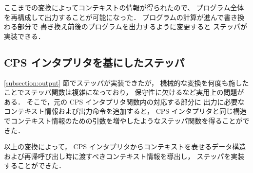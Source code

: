 ここまでの変換によってコンテキストの情報が得られたので、
プログラム全体を再構成して出力することが可能になった．
プログラムの計算が進んで書き換わる部分で
書き換え前後のプログラムを出力するように変更すると
ステッパが実装できる．

\subsection{CPS インタプリタを基にしたステッパ}
\label{subsection:stepper}

\ref{subsection:output} 節でステッパが実装できたが，
機械的な変換を何度も施したことでステッパ関数は複雑になっており，
保守性に欠けるなど実用上の問題がある．
そこで，元の CPS インタプリタ関数内の対応する部分に
出力に必要なコンテキスト情報および出力命令を追加すると，
CPS インタプリタと同じ構造でコンテキスト情報のための引数を増やしたようなステッパ関数を得ることができた．

以上の変換によって，
CPS インタプリタからコンテキストを表せるデータ構造および再帰呼び出し時に渡すべきコンテキスト情報を導出し，
ステッパを実装することができた．
